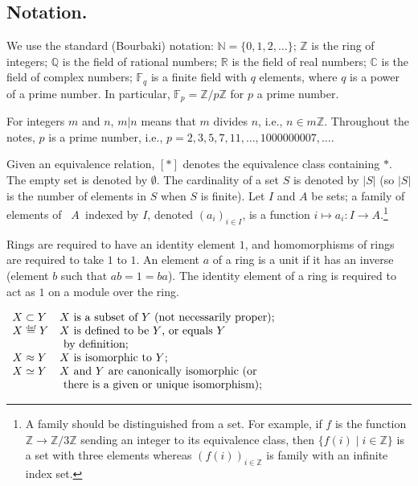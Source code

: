 \documentclass[a4paper,11pt,final]{memoir}%
\theoremstyle{nonumberplain}
\begin{document}
\setcounter{page}{2}
\clearpage\pagestyle{plain}
\vspace*{-0.5in}\tableoc


\clearpage


\subsection{Notation.}

\sloppy We use the standard (Bourbaki) notation: $\mathbb{N}=\{0,1,2,\ldots\}$;
$\mathbb{Z}$ is the ring of integers; $\mathbb{Q}{}$ is the field of rational
numbers; $\mathbb{R}{}$ is the field of real numbers; $\mathbb{C}{}$ is the
field of complex numbers; $\mathbb{F}_{q}$ is a finite field with $q$
elements, where $q$ is a power of a prime number. In particular,
$\mathbb{F}_{p}=\mathbb{Z}{}/p\mathbb{Z}{}$ for $p$ a prime number.

For integers $m$ and $n$, $m|n$ means that $m$ divides $n$, i.e., $n\in
m\mathbb{Z}{}$. Throughout the notes, $p$ is a prime number, i.e.,
$p=2,3,5,7,11,\ldots,1000000007,\ldots$.

Given an equivalence relation, $[\ast]$ denotes the equivalence class
containing $\ast$. The empty set is denoted by $\emptyset$. The cardinality of
a set $S$ is denoted by $|S|$ (so $|S|$ is the number of elements in $S$ when
$S$ is finite). Let $I$ and $A$ be sets; a family of elements of\emph{\ }%
$A$\emph{\ }indexed by $I$, denoted $(a_{i})_{i\in I}$, is a function
$i\mapsto a_{i}\colon I\rightarrow A$.\footnote{A family should be
distinguished from a set. For example, if $f$ is the function $\mathbb{Z}%
{}\rightarrow\mathbb{Z}{}/3\mathbb{Z}{}$ sending an integer to its equivalence
class, then $\{f(i)\mid i\in\mathbb{Z\}}$ is a set with three elements whereas
$(f(i))_{i\in\mathbb{Z}{}}$ is family with an infinite index set.}

Rings are required to have an identity element $1$, and homomorphisms of rings
are required to take $1$ to $1$. An element $a$ of a ring is a unit if it has
an inverse (element $b$ such that $ab=1=ba$). The identity element of a ring
is required to act as $1$ on a module over the ring.

\noindent$%
\begin{array}
[c]{ll}%
X\subset Y & X\text{ is a subset of }Y\text{ (not necessarily proper);}\\
X\overset{\df}{=}Y & X\text{ is defined to be }Y\text{, or
  equals }Y \\
& \text{ by definition;}\\
X\approx Y & X\text{ is isomorphic to }Y\text{;}\\
X\simeq Y & X\text{ and }Y\text{ are canonically isomorphic (or}\\
& \text{ there is a
given or unique isomorphism);}%
\end{array}
$
\end{document}
